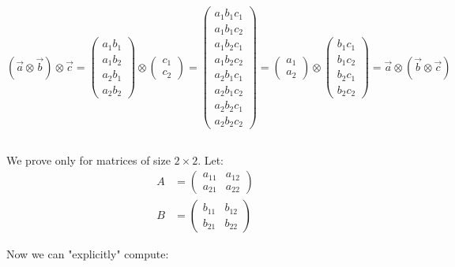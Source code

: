 \documentclass[a4paper,10pt]{hw}
\begin{document}
\subsection{}

$$
\left(\vec{a}\otimes\vec{b}\right)\otimes\vec{c}
=
\begin{pmatrix} a_1b_1 \\ a_1b_2 \\ a_2b_1 \\ a_2b_2 \end{pmatrix}
\otimes
\begin{pmatrix} c_1 \\ c_2 \end{pmatrix}
=
\begin{pmatrix} a_1b_1c_1 \\ a_1b_1c_2 \\ a_1b_2c_1 \\ a_1b_2c_2 
		\\ a_2b_1c_1 \\ a_2b_1c_2 \\ a_2b_2c_1 \\ a_2b_2c_2 \end{pmatrix}
=
\begin{pmatrix} a_1 \\ a_2 \end{pmatrix}
\otimes
\begin{pmatrix} b_1c_1 \\ b_1c_2 \\ b_2c_1 \\ b_2c_2 \end{pmatrix}
=
\vec{a} \otimes \left( \vec{b} \otimes \vec{c}\right)
$$

\subsection{}

We prove only for matrices of size $2\times2$. Let:
\begin{align*}
	A &= 
	\begin{pmatrix} a_{11} & a_{12} \\ a_{21} & a_{22} \end{pmatrix} \\
	B &=
	\begin{pmatrix} b_{11} & b_{12} \\ b_{21} & b_{22} \end{pmatrix}
\end{align*}

Now we can "explicitly" compute:
\end{document}
